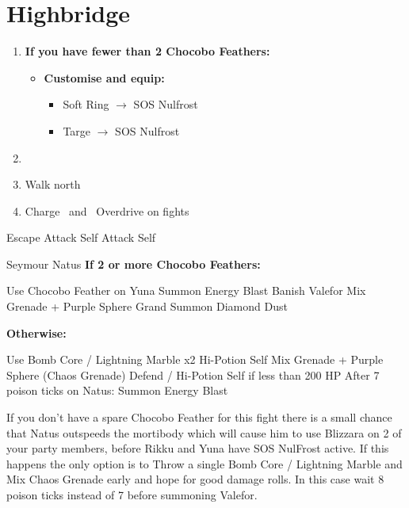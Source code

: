 \chapter{Highbridge}
\begin{enumerate}
	\item \textbf{If you have fewer than 2 Chocobo Feathers:}
		\begin{itemize}
			\item \textbf{Customise and equip:}
				\begin{itemize}
					\item Soft Ring $\rightarrow$ SOS Nulfrost
					\item Targe $\rightarrow$ SOS Nulfrost						
				\end{itemize}
		\end{itemize}
	\item \formation{\tidus}{\yuna}{\rikku}
	\item Walk north
	\item Charge \yuna\ and \rikku\ Overdrive on fights
\end{enumerate}
\begin{encounters}
	\begin{itemize}
		\tidusf Escape
		\rikkuf Attack Self
		\yunaf Attack Self
	\end{itemize}
\end{encounters}
\begin{battle}[36000]{Seymour Natus}
\textbf{If 2 or more Chocobo Feathers:}
	\begin{itemize}
		\switch{\tidus}{\rikku}
		\rikkuf Use Chocobo Feather on Yuna
		\yunaf Summon \valefor
		\valeforf Energy Blast
		\enemyf Banish Valefor
		\rikkuf Mix Grenade + Purple Sphere
		\yunaf Grand Summon \shiva
		\shivaf Diamond Dust
	\end{itemize}
\textbf{Otherwise:}
	\begin{itemize}
		\switch{\tidus}{\rikku}
		\rikkuf Use Bomb Core / Lightning Marble x2
		\yunaf Hi-Potion Self
		\rikkuf Mix Grenade + Purple Sphere (Chaos Grenade)
		\yunaf Defend / Hi-Potion Self if less than 200 HP
		\yunaf After 7 poison ticks on Natus: Summon \valefor
		\valeforf Energy Blast
	\end{itemize}
\vspace{\baselineskip}
If you don't have a spare Chocobo Feather for this fight there is a small chance that Natus outspeeds the mortibody which will cause him to use Blizzara on 2 of your party members, before Rikku and Yuna have SOS NulFrost active. If this happens the only option is to Throw a single Bomb Core / Lightning Marble and Mix Chaos Grenade early and hope for good damage rolls. In this case wait 8 poison ticks instead of 7 before summoning Valefor.
\end{battle}
